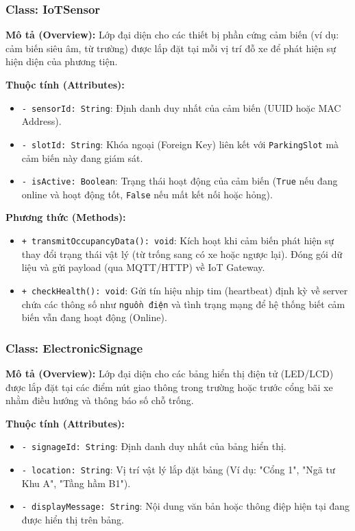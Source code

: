 \subsubsection{Class: IoTSensor}
\textbf{Mô tả (Overview):} Lớp đại diện cho các thiết bị phần cứng cảm biến (ví dụ: cảm biến siêu âm, từ trường) được lắp đặt tại mỗi vị trí đỗ xe để phát hiện sự hiện diện của phương tiện.

\vspace{0.3cm}
\noindent\textbf{Thuộc tính (Attributes):}
\begin{itemize}
    \item \texttt{- sensorId: String}: Định danh duy nhất của cảm biến (UUID hoặc MAC Address).
    \item \texttt{- slotId: String}: Khóa ngoại (Foreign Key) liên kết với \texttt{ParkingSlot} mà cảm biến này đang giám sát.
    \item \texttt{- isActive: Boolean}: Trạng thái hoạt động của cảm biến (\texttt{True} nếu đang online và hoạt động tốt, \texttt{False} nếu mất kết nối hoặc hỏng).
\end{itemize}

\noindent\textbf{Phương thức (Methods):}
\begin{itemize}
    \item \texttt{+ transmitOccupancyData(): void}: Kích hoạt khi cảm biến phát hiện sự thay đổi trạng thái vật lý (từ trống sang có xe hoặc ngược lại). Đóng gói dữ liệu và gửi payload (qua MQTT/HTTP) về IoT Gateway.
    \item \texttt{+ checkHealth(): void}: Gửi tín hiệu nhịp tim (heartbeat) định kỳ về server chứa các thông số như \texttt{nguồn điện} và tình trạng mạng để hệ thống biết cảm biến vẫn đang hoạt động (Online).
\end{itemize}


\subsubsection{Class: ElectronicSignage}
\textbf{Mô tả (Overview):} Lớp đại diện cho các bảng hiển thị điện tử (LED/LCD) được lắp đặt tại các điểm nút giao thông trong trường hoặc trước cổng bãi xe nhằm điều hướng và thông báo số chỗ trống.

\vspace{0.3cm}
\noindent\textbf{Thuộc tính (Attributes):}
\begin{itemize}
    \item \texttt{- signageId: String}: Định danh duy nhất của bảng hiển thị.
    \item \texttt{- location: String}: Vị trí vật lý lắp đặt bảng (Ví dụ: "Cổng 1", "Ngã tư Khu A", "Tầng hầm B1").
    \item \texttt{- displayMessage: String}: Nội dung văn bản hoặc thông điệp hiện tại đang được hiển thị trên bảng.
\end{itemize}

